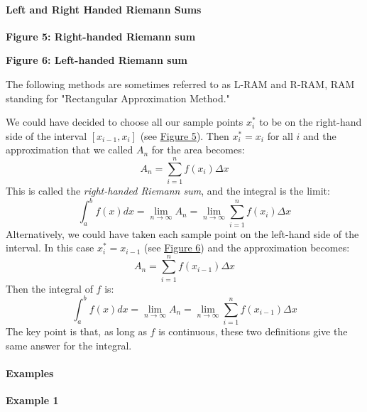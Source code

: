 \paragraph{Left and Right Handed Riemann Sums}




\textbf{Figure 5: Right-handed Riemann sum}


\textbf{Figure 6: Left-handed Riemann sum}



The following methods are sometimes referred to as L-RAM and R-RAM, RAM standing for "Rectangular Approximation Method."



We could have decided to choose all our sample points $x_{i}^\ast$ to be on the right-hand side of the interval $[x_{i-1}, x_{i}]$ (see \href{https://upload.wikimedia.org/wikipedia/commons/thumb/f/f9/Riemann-Sum-right-hand.png/350px-Riemann-Sum-right-hand.png}{Figure 5}). Then $x_{i}^\ast = x_{i}$ for all $i$ and the approximation that we called $A_n$ for the area becomes:
$$
A_n = \sum_{i=1}^n f(x_i) \Delta x
$$
This is called the \textit{right-handed Riemann sum}, and the integral is the limit:
$$
\int_a^b f(x) dx = \lim_{n \to \infty} A_n = \lim_{n \to \infty} \sum_{i=1}^n f(x_i) \Delta x
$$
Alternatively, we could have taken each sample point on the left-hand side of the interval. In this case $x_i^* = x_{i-1}$ (see \href{https://upload.wikimedia.org/wikipedia/commons/thumb/5/5d/Riemann_Sum_Left_Hand.png/350px-Riemann_Sum_Left_Hand.png}{Figure 6}) and the approximation becomes:
$$
A_n = \sum_{i=1}^n f(x_{i-1}) \Delta x
$$
Then the integral of $f$ is:
$$
\int_a^b f(x) dx = \lim_{n \to \infty} A_n = \lim_{n \to \infty} \sum_{i=1}^n f(x_{i-1}) \Delta x
$$
The key point is that, as long as $f$ is continuous, these two definitions give the same answer for the integral.



\paragraph{Examples}



\textbf{Example 1}



